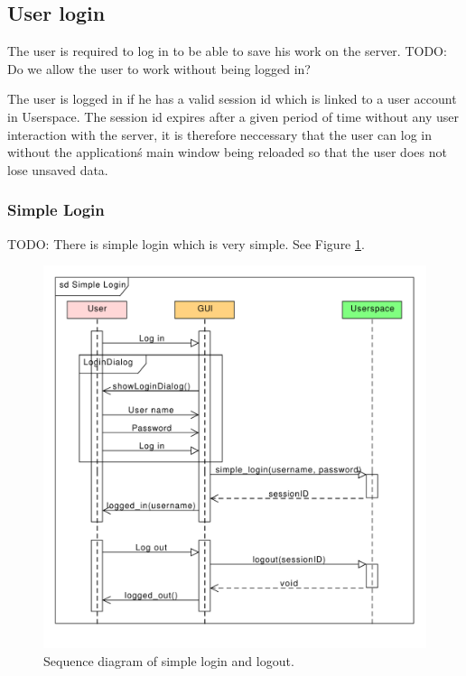 \subsection{User login}

The user is required to log in to be able to save his work on the server.
TODO: Do we allow the user to work without being logged in?

The user is logged in if he has a valid session id which is linked to a user account in Userspace.
The session id expires after a given period of time without any user interaction with the server,
it is therefore neccessary that the user can log in without the application\'s main window being reloaded so that the user does not lose unsaved data.

\subsubsection{Simple Login}

TODO: There is simple login which is very simple. See Figure \ref{gui:sd:simple_login}.


\begin{figure}[h]
\begin{center}
\includegraphics[scale=0.65]{figures/simple_login_sequence.pdf}
\end{center}
\caption{Sequence diagram of simple login and logout.}\label{gui:sd:simple_login}
\end{figure}

